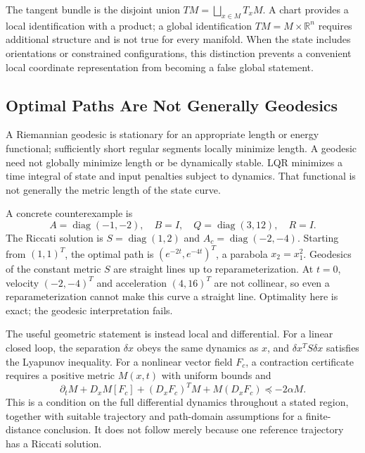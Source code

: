 The tangent bundle is the disjoint union $TM=\bigsqcup_{x\in M}T_xM$. A chart provides a local identification with a product; a global identification $TM=M\times\mathbb R^n$ requires additional structure and is not true for every manifold. When the state includes orientations or constrained configurations, this distinction prevents a convenient local coordinate representation from becoming a false global statement.

\subsection{Optimal Paths Are Not Generally Geodesics}

A Riemannian geodesic is stationary for an appropriate length or energy functional; sufficiently short regular segments locally minimize length. A geodesic need not globally minimize length or be dynamically stable. LQR minimizes a time integral of state and input penalties subject to dynamics. That functional is not generally the metric length of the state curve.

A concrete counterexample is
\begin{equation}
A=\operatorname{diag}(-1,-2),\quad B=I,\quad
Q=\operatorname{diag}(3,12),\quad R=I.
\end{equation}
The Riccati solution is $S=\operatorname{diag}(1,2)$ and $A_c=\operatorname{diag}(-2,-4)$. Starting from $(1,1)^T$, the optimal path is $(e^{-2t},e^{-4t})^T$, a parabola $x_2=x_1^2$. Geodesics of the constant metric $S$ are straight lines up to reparameterization. At $t=0$, velocity $(-2,-4)^T$ and acceleration $(4,16)^T$ are not collinear, so even a reparameterization cannot make this curve a straight line. Optimality here is exact; the geodesic interpretation fails.

The useful geometric statement is instead local and differential. For a linear closed loop, the separation $\delta x$ obeys the same dynamics as $x$, and $\delta x^TS\delta x$ satisfies the Lyapunov inequality. For a nonlinear vector field $F_c$, a contraction certificate requires a positive metric $M(x,t)$ with uniform bounds and
\begin{equation}
\partial_tM+D_xM[F_c]+(D_xF_c)^TM+M(D_xF_c)
\preceq-2\alpha M.
\end{equation}
This is a condition on the full differential dynamics throughout a stated region, together with suitable trajectory and path-domain assumptions for a finite-distance conclusion. It does not follow merely because one reference trajectory has a Riccati solution.

